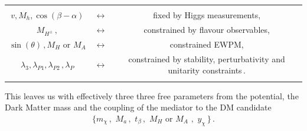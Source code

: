 %
\newline
\begin{tabular}{cc c}
&&\\
$v, M_h, \cos(\beta-\alpha) $&$\longleftrightarrow$& fixed by Higgs measurements,\\[.3cm]
$M_{H^\pm}\,, $  &$\longleftrightarrow $& constrained by flavour observables,\\[.3cm]
$\sin(\theta)\,, M_H \,\,\text{or} \,\,M_A$  &$\longleftrightarrow $& constrained EWPM,\\[.3cm]
$\lambda_3, \lambda_{P1}, \lambda_{P2}\,,\lambda_P $ &$\longleftrightarrow $& constrained by stability, perturbativity and unitarity constraints\,.\\[.3cm]
&&
\end{tabular}
\newline
%
This leaves us with effectively three three free parameters from the potential, the Dark Matter mass and the coupling of the mediator to the DM candidate
\begin{align}
\big\{ m_\chi\,,\,\,M_a\,,\,\, t_\beta\,, \,\, M_H\,\,\text{or}\,\,M_A\,\,, \,\, y_\chi\,\big\}\,.
\end{align}

%
%
%
%
%

